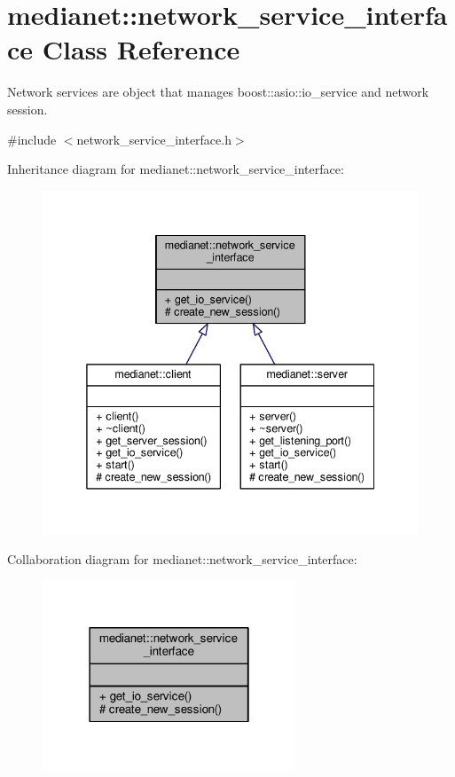 \hypertarget{classmedianet_1_1network__service__interface}{}\section{medianet\+::network\+\_\+service\+\_\+interface Class Reference}
\label{classmedianet_1_1network__service__interface}


Network services are object that manages boost\+::asio\+::io\+\_\+service and network session.  




{\ttfamily \#include $<$network\+\_\+service\+\_\+interface.\+h$>$}



Inheritance diagram for medianet\+::network\+\_\+service\+\_\+interface\+:
\nopagebreak
\begin{figure}[H]
\begin{center}
\leavevmode
\includegraphics[width=338pt]{classmedianet_1_1network__service__interface__inherit__graph}
\end{center}
\end{figure}


Collaboration diagram for medianet\+::network\+\_\+service\+\_\+interface\+:
\nopagebreak
\begin{figure}[H]
\begin{center}
\leavevmode
\includegraphics[width=214pt]{classmedianet_1_1network__service__interface__coll__graph}
\end{center}
\end{figure}
